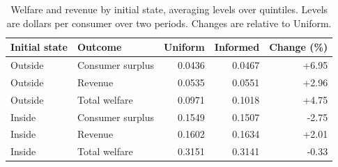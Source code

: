 \begin{table}[htbp]
\centering\small
\caption{Welfare and revenue by initial state, averaging levels over quintiles. Levels are dollars per consumer over two periods. Changes are relative to Uniform.}
\label{tab:plain-averages}
\begin{tabular}{llrrr}
\toprule
Initial state & Outcome & Uniform & Informed & Change (\%) \\
\midrule
Outside & Consumer surplus & 0.0436 & 0.0467 & +6.95 \\
Outside & Revenue & 0.0535 & 0.0551 & +2.96 \\
Outside & Total welfare & 0.0971 & 0.1018 & +4.75 \\
Inside & Consumer surplus & 0.1549 & 0.1507 & -2.75 \\
Inside & Revenue & 0.1602 & 0.1634 & +2.01 \\
Inside & Total welfare & 0.3151 & 0.3141 & -0.33 \\
\bottomrule
\end{tabular}
\end{table}
